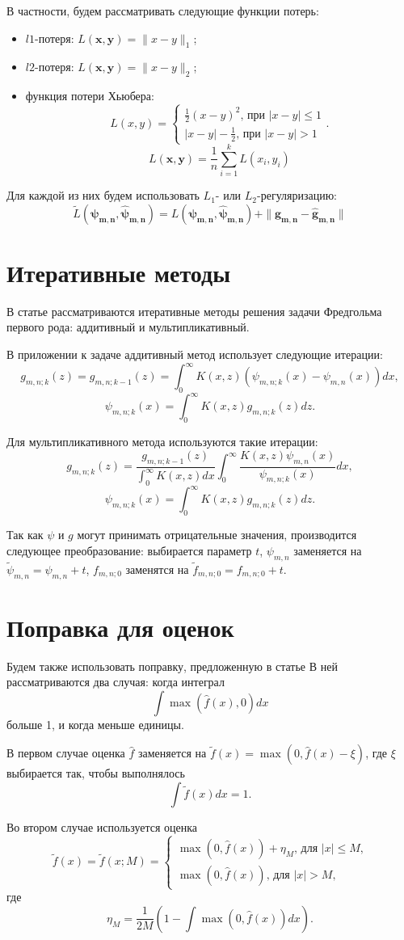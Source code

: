 \documentclass[../paper.tex]{subfiles}
\begin{document}
В частности, будем рассматривать следующие функции потерь:
\begin{itemize}
\item $l1$-потеря: $L(\bm{x}, \bm{y}) = \| x - y \|_1$;
\item $l2$-потеря: $L(\bm{x}, \bm{y}) = \| x - y \|_2$;
\item функция потери Хьюбера:
  \[
    L(x, y) =
    \begin{cases}
      \frac{1}{2} (x-y)^2 \text{, при $|x-y| \leqslant 1$} \\
      |x-y| - \frac{1}{2} \text{, при $|x-y| > 1$}
    \end{cases}.
  \]
  \[
    L(\bm{x}, \bm{y}) = \frac{1}{n} \sum_{i=1}^k L(x_i, y_i)
  \]
\end{itemize}

Для каждой из них будем использовать $L_1$- или $L_2$-регуляризацию:
\[
  \tilde{L}(\bm{\psi_{m,n}}, \bm{\hat{\psi}_{m,n}}) = L(\bm{\psi_{m,n}}, \bm{\hat{\psi}_{m,n}}) + \| \bm{g_{m,n}} - \bm{\hat{g}_{m,n}} \|
\]

\section{Итеративные методы}
В статье \cite{fredholm-integrals} рассматриваются итеративные методы решения задачи Фредгольма
первого рода: аддитивный и мультипликативный.

В приложении к задаче аддитивный метод использует следующие итерации:
\[
  g_{m,n;k}(z) = g_{m,n;k-1}(z) = \int_0^\infty K(x, z) (\psi_{m,n;k}(x) - \psi_{m,n}(x)) dx
,\]
\[
  \psi_{m,n;k}(x) = \int_0^\infty K(x, z) g_{m,n;k}(z) dz
.\]

Для мультипликативного метода используются такие итерации:
\[
  g_{m,n;k}(z) = \frac{g_{m,n;k-1}(z)}{\int_{0}^\infty K(x, z) dx} \int_{0}^\infty \frac{K(x, z) \psi_{m,n}(x)}{\psi_{m,n;k}(x)} dx
,\]
\[
  \psi_{m,n;k}(x) = \int_0^\infty K(x, z) g_{m,n;k}(z) dz
.\]

Так как $\psi$ и $g$ могут принимать отрицательные значения, производится
следующее преобразование: выбирается параметр $t$, $\psi_{m,n}$ заменяется
на $\tilde{\psi}_{m,n} = \psi_{m,n} + t$, $f_{m,n;0}$ заменятся на
$\tilde{f}_{m,n;0} = f_{m,n;0} + t$.
%
\section{Поправка для оценок}
Будем также использовать поправку, предложенную в статье \cite{correction-of-density-estimation}
В ней рассматриваются два случая: когда интеграл
\[
  \int \max(\hat{f}(x), 0) dx
\]
больше 1, и когда меньше единицы.

В первом случае оценка $\hat{f}$ заменяется на $\tilde{f}(x) = \max(0, \hat{f}(x) - \xi)$,
где $\xi$ выбирается так, чтобы выполнялось
\[
  \int \tilde{f}(x) dx = 1
.\]

Во втором случае используется оценка
\[
  \tilde{f}(x) = \tilde{f}(x; M) =
  \begin{cases}
    \max(0, \hat{f}(x)) + \eta_M \text{, для $|x| \leqslant M$,} \\
    \max(0, \hat{f}(x)) \text{, для $|x| > M$,}
  \end{cases}
\]
где
\[
  \eta_M = \frac{1}{2M} \left( 1 - \int \max(0, \hat{f}(x)) dx \right)
.\]
\end{document}
